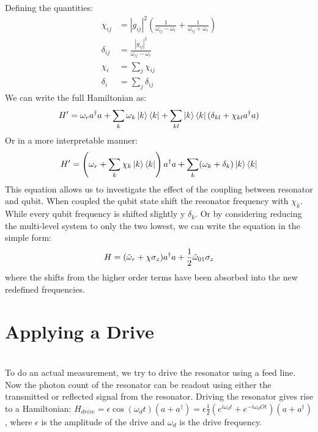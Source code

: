 Defining the quantities:
\begin{align}
    \chi_{ij} &= |g_{ij}|^2 \left(\frac{1}{\omega_{ij} - \omega_r} + \frac{1}{\omega_{ij} + \omega_r} \right) \\
    \delta_{ij} &= \frac{|g_{ij}|^2 }{\omega_{ij} - \omega_r} \\
    \chi_{i} &= \sum_j \chi_{ij} \\
    \delta_{i} &= \sum_j \delta_{ij} 
\end{align}
We can write the full Hamiltonian as:
\begin{equation}
    H' = \omega_r a^\dagger a + \sum_k \omega_k \ket{k}\bra{k} + \sum_{kl}\ket{k}\bra{k}(\delta_{kl} + \chi_{kl} a^\dagger a )
\end{equation}
Or in a more interpretable manner:
\begin{equation} \label{eq:multi_qubit_dispersive_hamiltonian}
    H' = \left(\omega_r + \sum_k \chi_k \ket{k}\bra{k} \right) a^\dagger a + \sum_k (\omega_k + \delta_k)\ket{k}\bra{k}
\end{equation}
This equation allows us to investigate the effect of the coupling between resonator and qubit. When coupled the qubit state shift the resonator frequency with $\chi_k$. While every qubit frequency is shifted slightly y $\delta_k$.
Or by considering reducing the multi-level system to only the two lowest, we can write the equation in the simple form:
\begin{equation}\label{eq:two_level_qubit_dispersive}
    H = (\Tilde{\omega}_r + \chi \sigma_z) a^\dagger a + \frac12 \Tilde{\omega}_{01} \sigma_z
\end{equation}
where the shifts from the higher order terms have been absorbed into the new redefined frequencies.



\section{Applying a Drive }
 \\
To do an actual measurement, we try to drive the resonator using a feed line. Now the photon count of the resonator can be readout using either the transmitted or reflected signal from the resonator. Driving the resonator gives rise to a Hamiltonian: $H_{drive} = \epsilon\cos(\omega_d t)(a + a^\dagger) = \epsilon\frac12 (e^{i\omega_d t} + e^{-i\omega_dO t})(a + a^\dagger)$, where $\epsilon$ is the amplitude of the drive and $\omega_d$ is the drive frequency.

